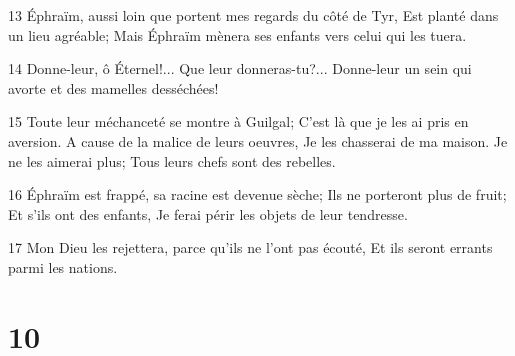 \par 13 Éphraïm, aussi loin que portent mes regards du côté de Tyr, Est planté dans un lieu agréable; Mais Éphraïm mènera ses enfants vers celui qui les tuera.
\par 14 Donne-leur, ô Éternel!... Que leur donneras-tu?... Donne-leur un sein qui avorte et des mamelles desséchées!
\par 15 Toute leur méchanceté se montre à Guilgal; C'est là que je les ai pris en aversion. A cause de la malice de leurs oeuvres, Je les chasserai de ma maison. Je ne les aimerai plus; Tous leurs chefs sont des rebelles.
\par 16 Éphraïm est frappé, sa racine est devenue sèche; Ils ne porteront plus de fruit; Et s'ils ont des enfants, Je ferai périr les objets de leur tendresse.
\par 17 Mon Dieu les rejettera, parce qu'ils ne l'ont pas écouté, Et ils seront errants parmi les nations.

\chapter{10}

